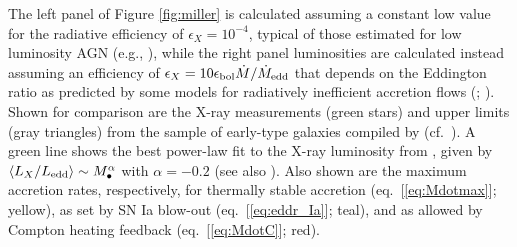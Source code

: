\documentclass[usenatbib,fleqn]{mn2e}
\newcommand{\Mbh}[1][]{M_{\bullet#1}}
\begin{document}
The left panel of Figure \ref{fig:miller} is calculated assuming a
constant low value for the radiative efficiency of $\epsilon_X =
10^{-4}$, typical of those estimated for low luminosity AGN (e.g.,
\citealt{Ho:2009a}), while the right panel luminosities are calculated
instead assuming an efficiency of $\epsilon_X= 10 \epsilon_{\rm
  bol}\dot{M}/\dot{M}_{\rm edd}$ that depends on the Eddington ratio
as predicted by some models for radiatively inefficient accretion
flows (\citealt{Narayan&Yi95}; \citealt{Narayan+98}).  Shown for
comparison are the X-ray measurements (green stars) and upper limits
(gray triangles) from the sample of early-type galaxies compiled by
\citet{Miller+15} (cf.~\citealt{Gallo+10}).  A green line shows the
best power-law fit to the X-ray luminosity from \citet{Miller+15},
given by $\langle L_X/L_{\rm edd}\rangle \sim \Mbh^\alpha$ with
$\alpha = -0.2$ (see also \citealt{Zhang+09, Pellegrini10, Gallo+10}).
Also shown are the maximum accretion rates, respectively, for
thermally stable accretion (eq.~[\ref{eq:Mdotmax}]; yellow), as set by
SN Ia blow-out (eq.~[\ref{eq:eddr_Ia}]; teal), and as allowed by
Compton heating feedback (eq.~[\ref{eq:MdotC}]; red).
\end{document}
